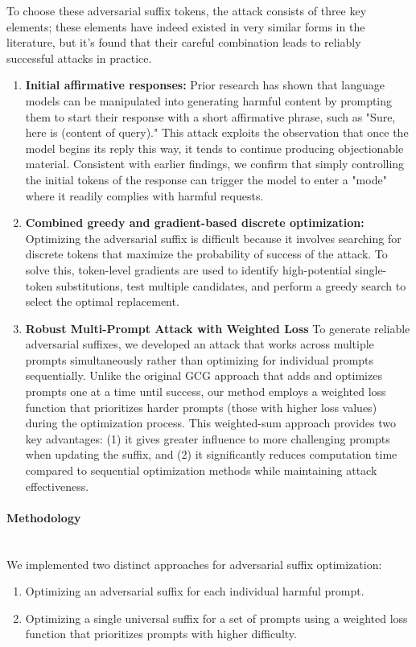 \documentclass[../main.tex]{subfiles}
\begin{document}
To choose these adversarial suffix tokens, the attack consists of three
key elements; these elements have indeed existed in very similar forms in the literature, but it's found that their careful combination leads to reliably successful attacks in practice.
\begin{enumerate}
    \item \textbf{Initial affirmative responses:}
    Prior research has shown that language models can be manipulated into generating harmful content by prompting them to start their response with a short affirmative phrase, such as "Sure, here is (content of query)." This attack exploits the observation that once the model begins its reply this way, it tends to continue producing objectionable material. Consistent with earlier findings, we confirm that simply controlling the initial tokens of the response can trigger the model to enter a "mode" where it readily complies with harmful requests.
    \item \textbf{Combined greedy and gradient-based discrete optimization:} 
   Optimizing the adversarial suffix is difficult because it involves searching for discrete tokens that maximize the probability of success of the attack. To solve this, token-level gradients are used to identify high-potential single-token substitutions, test multiple candidates, and perform a greedy search to select the optimal replacement.
   \item \textbf{Robust Multi-Prompt Attack with Weighted Loss}
   To generate reliable adversarial suffixes, we developed an attack that works across multiple prompts simultaneously rather than optimizing for individual prompts sequentially. Unlike the original GCG approach \cite{zou2023universaltransferableadversarialattacks} that adds and optimizes prompts one at a time until success, our method employs a weighted loss function that prioritizes harder prompts (those with higher loss values) during the optimization process. This weighted-sum approach provides two key advantages: (1) it gives greater influence to more challenging prompts when updating the suffix, and (2) it significantly reduces computation time compared to sequential optimization methods while maintaining attack effectiveness.
\end{enumerate}

\paragraph{Methodology}\leavevmode\\
We implemented two distinct approaches for adversarial suffix optimization:
\begin{enumerate}
    \item Optimizing an adversarial suffix for each individual harmful prompt.
    \item  Optimizing a single universal suffix for a set of prompts using a weighted loss function that prioritizes prompts with higher difficulty.
\end{enumerate}
\end{document}
